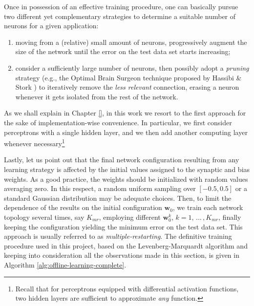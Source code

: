 \documentclass[12pt, a4paper, twoside, openright]{report}
\numberwithin{equation}{chapter}
\theoremstyle{theorem}
\theoremstyle{definition}
\theoremstyle{remark}
\theoremstyle{proposition}
\numberwithin{figure}{chapter}
\newcommand{\bg}[1]{\boldsymbol{#1}}
\begin{document}
		Once in possession of an effective training procedure, one can basically pursue two different yet complementary strategies to determine a suitable number of neurons for a given application:
		\begin{enumerate}[label=(\alph*)]
			\item moving from a (relative) small amount of neurons, progressively augment the size of the network until the error on the test data set starts increasing;
			\item consider a sufficiently large number of neurons, then possibly adopt a \emph{pruning} strategy (e.g., the Optimal Brain Surgeon technique proposed by Hassibi \& Stork \cite{OBS}) to iteratively remove the \emph{less relevant} connection, erasing a neuron whenever it gets isolated from the rest of the network.
		\end{enumerate}
		As we shall explain in Chapter \ref{}, in this work we resort to the first approach for the sake of implementation-wise convenience. In particular, we first consider perceptrons with a single hidden layer, and we then add another computing layer whenever necessary\footnote{Recall that for perceptrons equipped with differential activation functions, two hidden layers are sufficient to approximate \emph{any} function.}
		
		Lastly, let us point out that the final network configuration resulting from any learning strategy is affected by the initial values assigned to the synaptic and bias weights. As a good practice, the weights should be initialized with random values averaging zero. In this respect, a random uniform sampling over $[-0.5,0.5]$ or a standard Gaussian distribution may be adequate choices. Then, to limit the dependence of the results on the initial configuration $\bg{w}_0$, we train each network topology several times, say $K_{mr}$, employing different $\bg{w}_0^k$, $k = 1, \, \ldots \, , K_{mr}$, finally keeping the configuration yielding the minimum error on the test data set. This approach is usually referred to as \emph{multiple-restarting}. The definitive training procedure used in this project, based on the Levenberg-Marquardt algorithm and keeping into consideration all the observations made in this section, is given in Algorithm \ref{alg:offline-learning-complete}.
								
\end{document}
